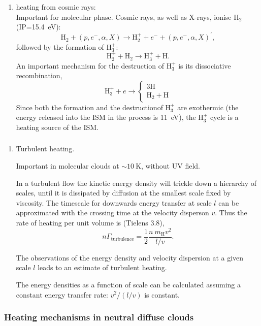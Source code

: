 \begin{frame}
\begin{enumerate}
\conti
\item heating from cosmic rays:\\
Important for molecular phase. Cosmic rays, as well as X-rays, ionise H$_2$ (IP=15.4~eV):
\[ \mathrm{H}_2 + (p,e^-,\alpha,X) \rightarrow \mathrm{H}_2^+ + e^- +  (p,e^-,\alpha,X)^\prime,
\]
followed by the formation of $\mathrm{H}_3^+$:
\[ \mathrm{H}_2^+ +   \mathrm{H}_2 \rightarrow \mathrm{H}_3^+ + \mathrm{H}. \]
An important mechanism for the destruction of H$_3^+$ is its
dissociative recombination,
\[ \mathrm{H}_3^+ + e \rightarrow \left\{ \begin{array}{c} 3\mathrm{H} \\
  \mathrm{H}_2 + \mathrm{H} \end{array} \right. \] Since both the
  formation and the destructionof H$_3^+$ are exothermic (the energy
  released into the ISM in the process is 11~eV), the 
  H$_3^+$ cycle is a heating source of the ISM.
\seti
\end{enumerate}

\end{frame} \begin{frame}\frametitle{}


\begin{enumerate}
\conti
\item Turbulent heating.

Important in molecular clouds at $\sim 10~$K, without UV field. 


In a turbulent flow the kinetic energy density will trickle down a
hierarchy of scales, until it is dissipated by diffusion at the
smallest scale fixed by viscosity. The timescale for downwards energy
transfer at scale $l$ can be approximated with the crossing time at
the velocity disperson $v$. Thus the rate of heating per unit volume
is (Tielens 3.8),
\[ n \Gamma_\mathrm{turbulence} = \frac{1}{2} \frac{n ~ m_\mathrm{H}
v^2}{l/v} . \]

The observations of the energy density and velocity dispersion at a
given scale $l$ leads to an estimate of turbulent heating. 

The energy densities as a function of scale can be calculated assuming
a constant energy transfer rate: $ v^2 / (l/v)$ is constant. 
\seti
\end{enumerate}

\end{frame} \begin{frame}\frametitle{Heating mechanisms in neutral diffuse clouds}


\end{frame}

